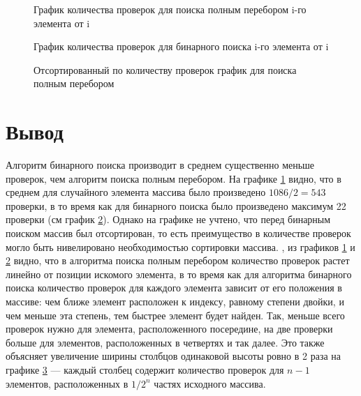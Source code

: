 \documentclass{bmstu}
\begin{document}
\begin{figure}[t!]
	\centering
        \vspace{0pt}
	
	\caption{График количества проверок для поиска полным перебором i-го элемента от i}
        \vspace*{3in}
	\label{fig:full_plot}
\end{figure}

\begin{figure}[t!]
	\centering
        \vspace{0pt}
	
	\caption{График количества проверок для бинарного поиска i-го элемента от i}
        \vspace*{3in}
	\label{fig:bin_plot}
\end{figure}

\clearpage
\begin{figure}[t!]
	\centering
        \vspace{0pt}
	
	\caption{Отсортированный по количеству проверок график для поиска полным перебором}
        \vspace*{3in}
	\label{fig:bin_sorted_plot}
\end{figure}

\clearpage

\section*{Вывод}
Алгоритм бинарного поиска производит в среднем существенно меньше проверок, чем алгоритм поиска полным перебором. На графике \ref{fig:full_plot} видно, что в среднем для случайного элемента массива было произведено $1086 / 2 = 543$ проверки, в то время как для бинарного поиска было произведено максимум 22 проверки (см график \ref{fig:bin_plot}). Однако на графике не учтено, что перед бинарным поиском массив был отсортирован, то есть преимущество в количестве проверок могло быть нивелировано необходимостью сортировки массива.
, из графиков \ref{fig:full_plot} и \ref{fig:bin_plot} видно, что в алгоритма поиска полным перебором количество проверок растет линейно от позиции искомого элемента, в то время как для алгоритма бинарного поиска количество проверок для каждого элемента зависит от его положения в массиве: чем ближе элемент расположен к индексу, равному степени двойки, и чем меньше эта степень, тем быстрее элемент будет найден. Так, меньше всего проверок нужно для элемента, расположенного посередине, на две проверки больше для элементов, расположенных в четвертях и так далее. Это также объясняет увеличение ширины столбцов одинаковой высоты ровно в 2 раза на графике \ref{fig:bin_sorted_plot} --- каждый столбец содержит количество проверок для $n - 1$ элементов, расположенных в $1 / 2^{n}$ частях исходного массива.
\end{document}
